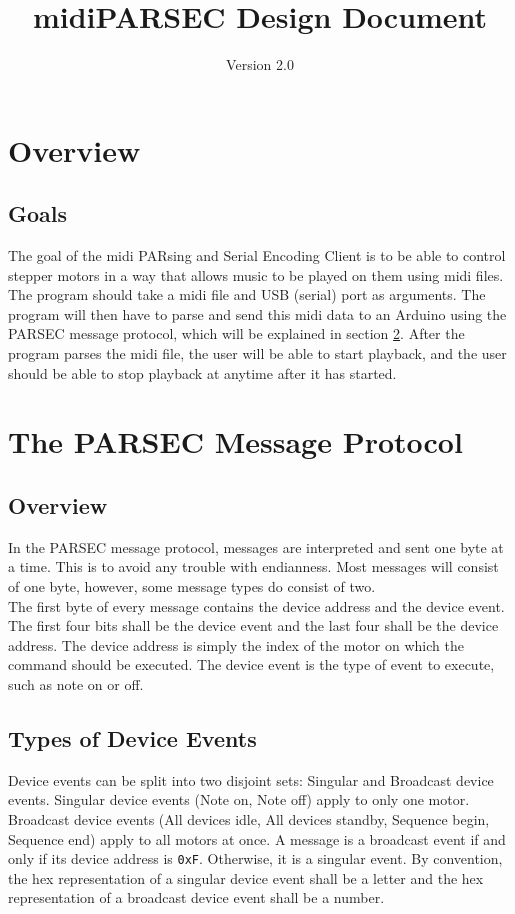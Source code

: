 \documentclass{article}
\title{midiPARSEC Design Document}
\author{Version 2.0}
\date{}
\begin{document}
\maketitle

\section{Overview}

\subsection{Goals}
\noindent The goal of the midi PARsing and Serial Encoding Client is to be able to control stepper motors in a way that allows music to be played on them using midi files. The program should take a midi file and USB (serial) port as arguments. The program will then have to parse and send this midi data to an Arduino using the PARSEC message protocol, which will be explained in section \ref{parsec protocol}. After the program parses the midi file, the user will be able to start playback, and the user should be able to stop playback at anytime after it has started.


\section{The PARSEC Message Protocol}
\label{parsec protocol}

\subsection{Overview}
\noindent In the PARSEC message protocol, messages are interpreted and sent one byte at a time. This is to avoid any trouble with endianness. Most messages will consist of one byte, however, some message types do consist of two.\\

\noindent The first byte of every message contains the device address and the device event. The first four bits shall be the device event and the last four shall be the device address. The device address is simply the index of the motor on which the command should be executed. The device event is the type of event to execute, such as note on or off.\\

\subsection{Types of Device Events}
\noindent Device events can be split into two disjoint sets: Singular and Broadcast device events. Singular device events (Note on, Note off) apply to only one motor. Broadcast device events (All devices idle, All devices standby, Sequence begin, Sequence end) apply to all motors at once. A message is a broadcast event if and only if its device address is \verb"0xF". Otherwise, it is a singular event. By convention, the hex representation of a singular device event shall be a letter and the hex representation of a broadcast device event shall be a number.
\end{document}
